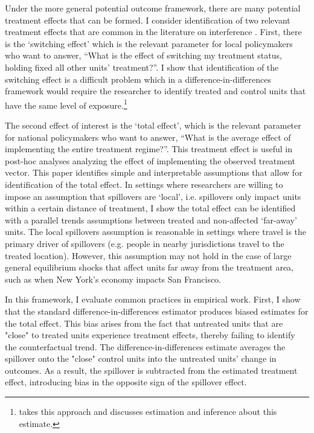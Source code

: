 Under the more general potential outcome framework, there are many potential treatment effects that can be formed. I consider identification of two relevant treatment effects that are common in the literature on interference \citep{savje2021average}. First, there is the `switching effect' which is the relevant parameter for local policymakers who want to answer, ``What is the effect of switching my treatment status, holding fixed all other units' treatment?''. I show that identification of the switching effect is a difficult problem which in a difference-in-differences framework would require the researcher to identify treated and control units that have the same level of exposure.\footnote{\citet{xu2023difference} takes this approach and discusses estimation and inference about this estimate.} 

The second effect of interest is the `total effect', which is the relevant parameter for national policymakers who want to answer, ``What is the average effect of implementing the entire treatment regime?''. This treatment effect is useful in post-hoc analyses analyzing the effect of implementing the observed treatment vector. This paper identifies simple and interpretable assumptions that allow for identification of the total effect. In settings where researchers are willing to impose an assumption that spillovers are `local', i.e. spillovers only impact units within a certain distance of treatment, I show the total effect can be identified with a parallel trends assumptions between treated and non-affected `far-away' units. The local spillovers assumption is reasonable in settings where travel is the primary driver of spillovers (e.g. people in nearby jurisdictions travel to the treated location). However, this assumption may not hold in the case of large general equilibrium shocks that affect units far away from the treatment area, such as when New York's economy impacts San Francisco.

In this framework, I evaluate common practices in empirical work. First, I show that the standard difference-in-differences estimator produces biased estimates for the total effect. This bias arises from the fact that untreated units that are "close" to treated units experience treatment effects, thereby failing to identify the counterfactual trend. The difference-in-differences estimate averages the spillover onto the "close" control units into the untreated units' change in outcomes. As a result, the spillover is subtracted from the estimated treatment effect, introducing bias in the opposite sign of the spillover effect. 

